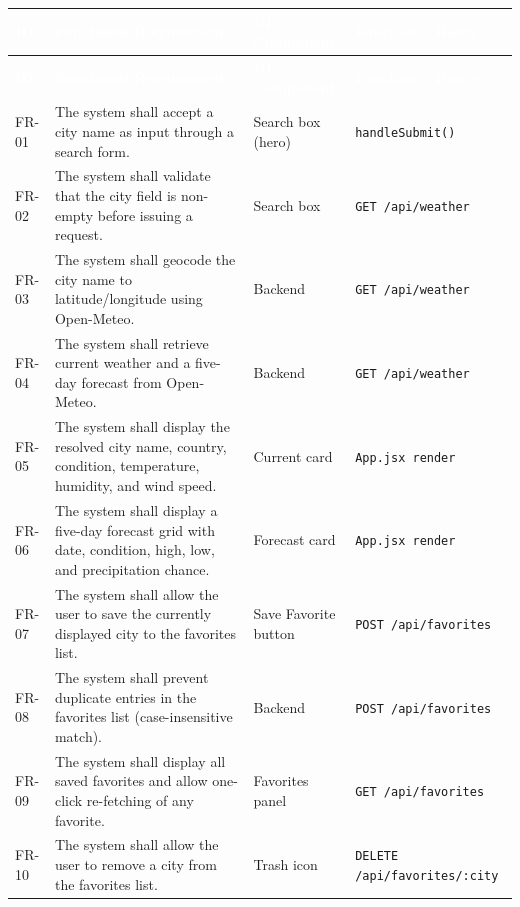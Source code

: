 \documentclass[11pt,letterpaper]{article}
\renewcommand{\arraystretch}{1.25}
\newcommand{\thead}[1]{\textcolor{white}{\bfseries #1}}
\begin{document}
\renewcommand{\arraystretch}{1.3}
\begin{longtable}{| C{0.55in} | L{2.9in} | L{1in} | L{1.3in} |}
\hline
{}\thead{ID} & \thead{Functional Requirement} & \thead{UI Component} & \thead{Function / Route} \\
\hline
\endfirsthead
\hline
{}\thead{ID} & \thead{Functional Requirement} & \thead{UI Component} & \thead{Function / Route} \\
\hline
\endhead
FR-01 & The system shall accept a city name as input through a search form. & Search box (hero) & \texttt{\footnotesize handleSubmit()} \\ \hline
{}FR-02 & The system shall validate that the city field is non-empty before issuing a request. & Search box & \texttt{\footnotesize GET /api/weather} \\ \hline
FR-03 & The system shall geocode the city name to latitude/longitude using Open-Meteo. & Backend & \texttt{\footnotesize GET /api/weather} \\ \hline
{}FR-04 & The system shall retrieve current weather and a five-day forecast from Open-Meteo. & Backend & \texttt{\footnotesize GET /api/weather} \\ \hline
FR-05 & The system shall display the resolved city name, country, condition, temperature, humidity, and wind speed. & Current card & \texttt{\footnotesize App.jsx render} \\ \hline
{}FR-06 & The system shall display a five-day forecast grid with date, condition, high, low, and precipitation chance. & Forecast card & \texttt{\footnotesize App.jsx render} \\ \hline
FR-07 & The system shall allow the user to save the currently displayed city to the favorites list. & Save Favorite button & \texttt{\footnotesize POST /api/favorites} \\ \hline
{}FR-08 & The system shall prevent duplicate entries in the favorites list (case-insensitive match). & Backend & \texttt{\footnotesize POST /api/favorites} \\ \hline
FR-09 & The system shall display all saved favorites and allow one-click re-fetching of any favorite. & Favorites panel & \texttt{\footnotesize GET /api/favorites} \\ \hline
{}FR-10 & The system shall allow the user to remove a city from the favorites list. & Trash icon & \texttt{\footnotesize DELETE /api/favorites/:city} \\ \hline

\end{longtable}
\end{document}
